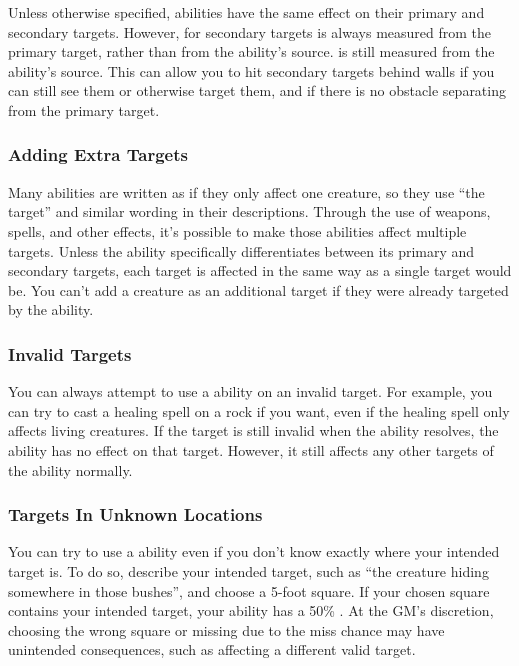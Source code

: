       Unless otherwise specified, abilities have the same effect on their primary and secondary targets.
      However,  for secondary targets is always measured from the primary target, rather than from the ability's source.
       is still measured from the ability's source.
      This can allow you to hit secondary targets behind walls if you can still see them or otherwise target them, and if there is no obstacle separating from the primary target.

    \subsubsection{Adding Extra Targets}
      Many abilities are written as if they only affect one creature, so they use ``the target'' and similar wording in their descriptions.
      Through the use of  weapons,  spells, and other effects, it's possible to make those abilities affect multiple targets.
      Unless the ability specifically differentiates between its primary and secondary targets, each target is affected in the same way as a single target would be.
      You can't add a creature as an additional target if they were already targeted by the ability.

    \subsubsection{Invalid Targets}
      You can always attempt to use a  ability on an invalid target.
      For example, you can try to cast a healing spell on a rock if you want, even if the healing spell only affects living creatures.
      If the target is still invalid when the ability resolves, the ability has no effect on that target.
      However, it still affects any other targets of the ability normally.

    \subsubsection{Targets In Unknown Locations}
      You can try to use a  ability even if you don't know exactly where your intended target is.
      To do so, describe your intended target, such as ``the creature hiding somewhere in those bushes'', and choose a 5-foot square.
      If your chosen square contains your intended target, your ability has a 50\% .
      At the GM's discretion, choosing the wrong square or missing due to the miss chance may have unintended consequences, such as affecting a different valid target.

